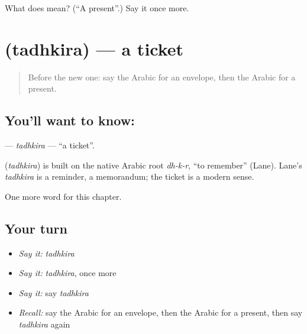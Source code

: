 \begin{tcolorbox}[breakable,colback=teal!4,colframe=teal!35!black,title={Before you move on}]
What does  mean? (\textquotedblleft{}A present\textquotedblright{}.) Say it once more.
\end{tcolorbox}
\section[\texorpdfstring{\ar{تذكرة} (tadhkira)}{تذكرة (tadhkira)}]{ (tadhkira) — a ticket}

\label{lesson:AR-C118-tadhkira}



\begin{quote}
Before the new one: say the Arabic for an envelope, then the Arabic for a present.
\end{quote}

\subsection*{You'll want to know: }
\textbf{} — \emph{tadhkira} — \textquotedblleft{}a ticket\textquotedblright{}.

\begin{cousinweb}
\textbf{} (\emph{tadhkira}) is built on the native Arabic root \emph{dh-k-r}, \textquotedblleft{}to remember\textquotedblright{} (Lane). Lane's \emph{tadhkira} is a reminder, a memorandum; the ticket is a modern sense.
\end{cousinweb}

\begin{grammarlens}[title={What you've built}]
One more word for this chapter.
\end{grammarlens}

\subsection*{Your turn}
\begin{itemize}
\raggedright
  \item \emph{Say it:} \emph{tadhkira}
  \item \emph{Say it:} \emph{tadhkira}, once more
  \item \emph{Say it:} say \emph{tadhkira}
  \item \emph{Recall:} say the Arabic for an envelope, then the Arabic for a present, then say \emph{tadhkira} again
\end{itemize}

